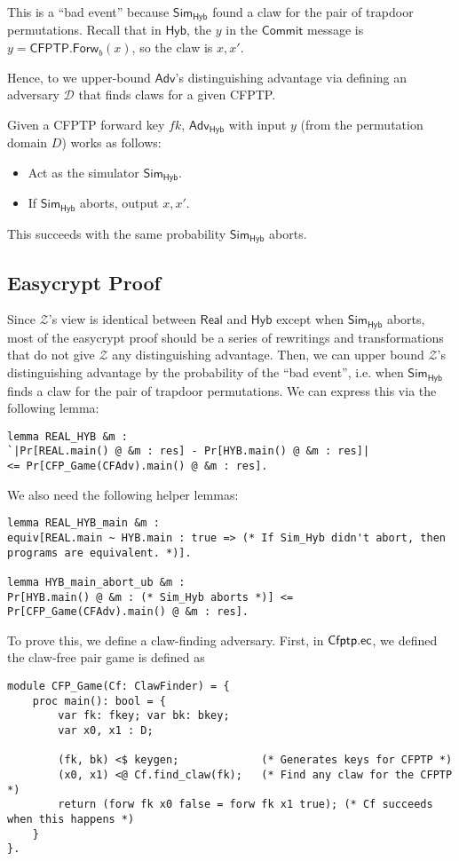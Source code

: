 \documentclass{article}[11pt]
\newcommand{\Sim}{{\mathsf{Sim}}} %
\newcommand{\Adversary}{{\mathsf{Adv}}} %
\newcommand{\Environment}{{\mathcal{Z}}} %
\newcommand{\CFPTPAdversary}{{\mathcal{D}}}
\newcommand{\Hyb}{{\mathsf{Hyb}}}
\newcommand{\Real}{{\mathsf{Real}}}
\newcommand{\CommitMsg}{\mathsf{Commit}}
\newcommand{\CFPTP}{\mathsf{CFPTP}}
\newcommand{\Forw}{\mathsf{Forw}}
\newcommand{\ForwKey}{fk}
\newcommand{\Domain}{D}
\begin{document}
This is a ``bad event'' because $\Sim_\Hyb$ found a claw for the pair of trapdoor permutations. Recall that in $\Hyb$, the $y$ in the $\CommitMsg$ message is $y = \CFPTP.\Forw_{b}(x)$, so the claw is $x, x'$.

Hence, to we upper-bound $\Adversary$'s distinguishing advantage via defining an adversary $\CFPTPAdversary$ that finds claws for a given CFPTP.

Given a CFPTP forward key $\ForwKey$, $\Adversary_{\Hyb}$ with input $y$ (from the permutation domain $\Domain$) works as follows:
\begin{itemize}
	\item Act as the simulator $\Sim_\Hyb$.
	\item If $\Sim_\Hyb$ aborts, output $x, x'$.
\end{itemize}
This succeeds with the same probability $\Sim_\Hyb$ aborts.

\subsection{Easycrypt Proof}
Since $\Environment$'s view is identical between $\Real$ and $\Hyb$ except when $\Sim_\Hyb$ aborts, most of the easycrypt proof should be a series of rewritings and transformations that do not give $\Environment$ any distinguishing advantage. Then, we can upper bound $\Environment$'s distinguishing advantage by the probability of the ``bad event'', i.e. when $\Sim_\Hyb$ finds a claw for the pair of trapdoor permutations. We can express this via the following lemma:
\begin{lstlisting}
lemma REAL_HYB &m :
`|Pr[REAL.main() @ &m : res] - Pr[HYB.main() @ &m : res]|
<= Pr[CFP_Game(CFAdv).main() @ &m : res].
\end{lstlisting}

We also need the following helper lemmas:
\begin{lstlisting}
lemma REAL_HYB_main &m :
equiv[REAL.main ~ HYB.main : true => (* If Sim_Hyb didn't abort, then programs are equivalent. *)].

lemma HYB_main_abort_ub &m :
Pr[HYB.main() @ &m : (* Sim_Hyb aborts *)] <= Pr[CFP_Game(CFAdv).main() @ &m : res].
\end{lstlisting}

To prove this, we define a claw-finding adversary. First, in ${\sf Cfptp.ec}$, we defined the claw-free pair game is defined as
\begin{lstlisting}
module CFP_Game(Cf: ClawFinder) = {
	proc main(): bool = {
		var fk: fkey; var bk: bkey;
    	var x0, x1 : D;

    	(fk, bk) <$ keygen;             (* Generates keys for CFPTP *)
    	(x0, x1) <@ Cf.find_claw(fk);   (* Find any claw for the CFPTP *)
    	return (forw fk x0 false = forw fk x1 true); (* Cf succeeds when this happens *)
  	}
}.
\end{lstlisting}
\end{document}
